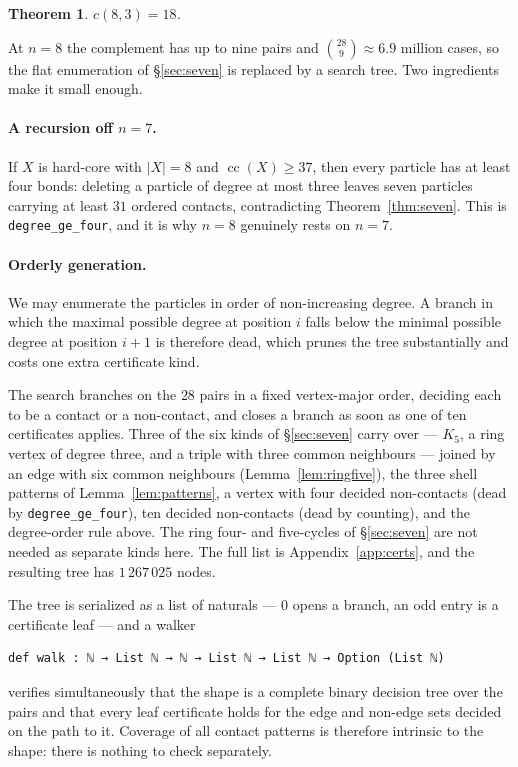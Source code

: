 \documentclass[11pt,a4paper]{article}
\theoremstyle{plain}
\newtheorem{theorem}{Theorem}[section]
\theoremstyle{definition}
\newcommand{\card}[1]{\lvert #1 \rvert}
\begin{document}
\begin{theorem}
\label{thm:eight}
$c(8,3) = 18$.
\end{theorem}

At $n=8$ the complement has up to nine pairs and $\binom{28}{9} \approx 6.9$ million
cases, so the flat enumeration of \S\ref{sec:seven} is replaced by a search tree. Two
ingredients make it small enough.

\paragraph{A recursion off $n=7$.} If $X$ is hard-core with $\card X = 8$ and
$\operatorname{cc}(X) \ge 37$, then every particle has at least four bonds: deleting a
particle of degree at most three leaves seven particles carrying at least $31$ ordered
contacts, contradicting Theorem~\ref{thm:seven}. This is
\texttt{degree\_ge\_four}, and it is why $n=8$ genuinely rests on $n=7$.

\paragraph{Orderly generation.} We may enumerate the particles in order of
non-increasing degree. A branch in which the maximal possible degree at position $i$
falls below the minimal possible degree at position $i+1$ is therefore dead, which
prunes the tree substantially and costs one extra certificate kind.

The search branches on the $28$ pairs in a fixed vertex-major order, deciding each to
be a contact or a non-contact, and closes a branch as soon as one of ten certificates
applies. Three of the six kinds of \S\ref{sec:seven} carry over --- $K_5$, a ring vertex
of degree three, and a triple with three common neighbours --- joined by an edge with
six common neighbours (Lemma~\ref{lem:ringfive}), the three shell patterns of
Lemma~\ref{lem:patterns}, a vertex with four decided non-contacts (dead by
\texttt{degree\_ge\_four}), ten decided non-contacts (dead by counting), and the
degree-order rule above. The ring four- and five-cycles of \S\ref{sec:seven} are not
needed as separate kinds here. The full list is Appendix~\ref{app:certs}, and the
resulting tree has $1\,267\,025$ nodes.

The tree is serialized as a list of naturals --- $0$ opens a branch, an odd entry is a
certificate leaf --- and a walker
\begin{Verbatim}
def walk : ℕ → List ℕ → ℕ → List ℕ → List ℕ → Option (List ℕ)
\end{Verbatim}
verifies simultaneously that the shape is a complete binary decision tree over the
pairs and that every leaf certificate holds for the edge and non-edge sets decided on
the path to it. Coverage of all contact patterns is therefore intrinsic to the shape:
there is nothing to check separately.
\end{document}
